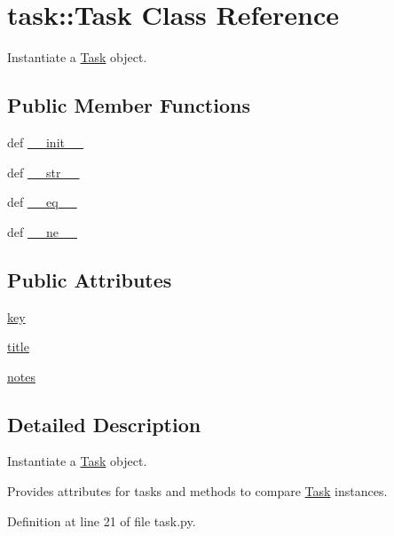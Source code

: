 \hypertarget{classtask_1_1Task}{
\section{task\-:\-:\-Task \-Class \-Reference}
\label{classtask_1_1Task}
}


\-Instantiate a \hyperlink{classtask_1_1Task}{\-Task} object.  


\subsection*{\-Public \-Member \-Functions}
\begin{DoxyCompactItemize}
\item 
def \hyperlink{classtask_1_1Task_aa3d495c785de9774c66a730535b4c08f}{\-\_\-\-\_\-init\-\_\-\-\_\-}
\item 
def \hyperlink{classtask_1_1Task_ac32eb0d8fd34e4ae11e7cb24a1c7f99d}{\-\_\-\-\_\-str\-\_\-\-\_\-}
\item 
def \hyperlink{classtask_1_1Task_a455e3fe2cfeb638a43cbc950125af569}{\-\_\-\-\_\-eq\-\_\-\-\_\-}
\item 
def \hyperlink{classtask_1_1Task_a45fab314fc54abbc30d6c979db9b4612}{\-\_\-\-\_\-ne\-\_\-\-\_\-}
\end{DoxyCompactItemize}
\subsection*{\-Public \-Attributes}
\begin{DoxyCompactItemize}
\item 
\hyperlink{classtask_1_1Task_a028cd6524320407ce6cae1c2e4f0914a}{key}
\item 
\hyperlink{classtask_1_1Task_a877528ec8ead8e0efa64d3eb1dc0e0d1}{title}
\item 
\hyperlink{classtask_1_1Task_a4f2e0a8b798d9a631c2d32c3d53e8533}{notes}
\end{DoxyCompactItemize}


\subsection{\-Detailed \-Description}
\-Instantiate a \hyperlink{classtask_1_1Task}{\-Task} object. 

\-Provides attributes for tasks and methods to compare \hyperlink{classtask_1_1Task}{\-Task} instances. 

\-Definition at line 21 of file task.\-py.



